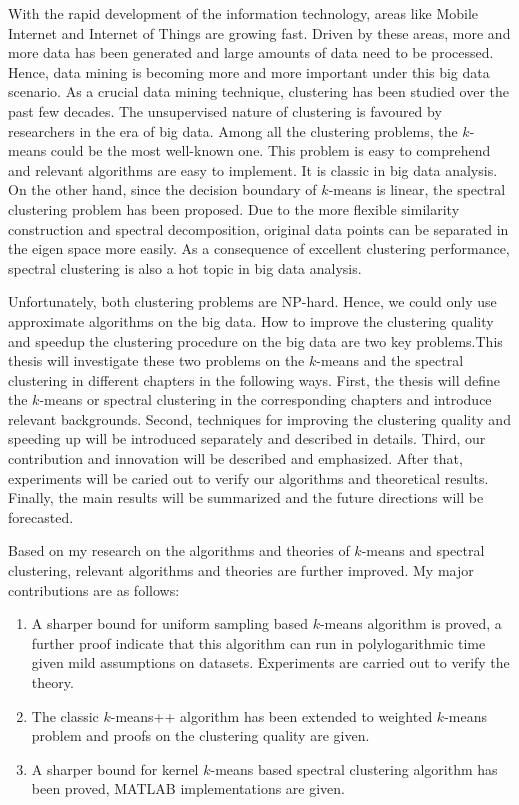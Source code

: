 
\begin{englishabstract}
	With the rapid development of the information technology, areas like Mobile Internet and Internet of Things are
growing fast. Driven by these areas, more and more data has been generated and large amounts of data need to be processed.
Hence, data mining is becoming more and more important under this big data scenario. As a crucial data mining technique,
clustering has been studied over the past few decades. The unsupervised nature of clustering is favoured by researchers in the era of big data. Among all the clustering problems, the $k$-means could be the most well-known one. This problem is easy to comprehend and relevant algorithms are easy to implement. It is classic in big data analysis. On the other hand, since the decision boundary of $k$-means is linear, the spectral clustering problem has been proposed. Due to the more flexible similarity construction and spectral decomposition, original data points can be separated in the eigen space more easily. As a consequence of excellent clustering performance, spectral clustering is also a hot topic in big data analysis.
	
Unfortunately, both clustering problems are NP-hard. Hence, we could only use approximate algorithms on the big data. How to improve the clustering quality and speedup the clustering procedure on the big data are two key problems.This thesis will investigate these two problems on the $k$-means and the spectral clustering in different chapters in the following ways. First, the thesis will define the $k$-means or spectral clustering in the corresponding chapters and introduce relevant backgrounds. Second, techniques for improving the clustering quality and speeding up will be introduced separately and described in details. Third, our contribution and innovation will be described and emphasized. After that, experiments will be caried out to verify our algorithms and theoretical results. Finally, the main results will be summarized and the future directions will be forecasted.

Based on my research on the algorithms and theories of $k$-means and spectral clustering, relevant algorithms and theories are further improved. My major contributions are as follows:
\begin{enumerate}
	\item A sharper bound for uniform sampling based $k$-means algorithm is proved, a further proof indicate that this algorithm can run in polylogarithmic time given mild assumptions on datasets. Experiments are carried out to verify the theory.
	\item The classic $k$-means++ algorithm has been extended to weighted $k$-means problem and proofs on the clustering quality are given.
	\item A sharper bound for kernel $k$-means based spectral clustering algorithm has been proved, MATLAB implementations are given.
\end{enumerate}


\end{englishabstract}
